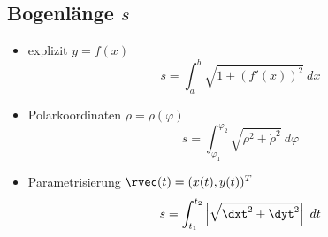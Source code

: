 \subsection{Bogenlänge \texorpdfstring{\hfill $s\ $}{s}}
    \begin{itemize}
        \item explizit $y = f(x)$
            $$
                s = \int_a^b \sqrt{1 + \left( f'(x) \right)^2} \ dx
            $$
        \item Polarkoordinaten $\rho = \rho(\varphi)$
            $$
                s = \int_{\varphi_1}^{\varphi_2} \sqrt{\rho^2 + \dot{\rho}^2} \ d\varphi
            $$
        \item Parametrisierung $\rvec(t) = (x(t),y(t))^T$
            $$
                s = \int_{t_1}^{t_2} \left\lvert \sqrt{\dxt^2 + \dyt^2} \right\rvert \ dt
            $$
    \end{itemize}